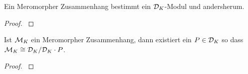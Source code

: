 \begin{thm}
\cite[Thm 4.3.2]{sabbah_cimpa90}
Ein Meromorpher Zusammenhang bestimmt ein $\mathcal{D}_K$-Modul
und andersherum.
\end{thm}
\begin{proof}
\cite[Thm 4.3.2]{sabbah_cimpa90}
\end{proof}

\begin{lem}
\cite[Satz 4.12]{ZulaBarbara}
\cite[Thm 4.3.2]{sabbah_cimpa90}
Ist $\mathcal{M}_K$ ein Meromorpher Zusammenhang, dann existiert ein $P\in\mathcal{D}_K$ so
dass $\mathcal{M}_K\cong\mathcal{D}_K/\mathcal{D}_K\cdot P$.
\end{lem}
\begin{proof}
\cite[Satz 4.12]{ZulaBarbara}
\end{proof}
\begin{comment}
\begin{rem}
\cite[Proof of Theorem 5.4.7]{sabbah_cimpa90}
\[
\dim_{\hat K}\cM_{\hat K} =\deg P \mbox{ wenn } \cM_{\hat K}=\cD/\cD\cdot P
\]
\end{rem}
\end{comment}

